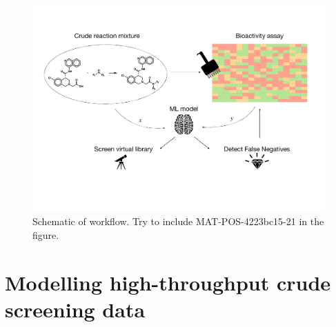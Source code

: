 
\begin{figure}
    \centering
    \includegraphics[width=\textwidth]{Chapters/Crude/Figs/schematic.pdf}
    \caption{Schematic of workflow. Try to include MAT-POS-4223bc15-21 in the figure. }
    \label{fig:schematic}
\end{figure}

\section{Modelling high-throughput crude screening data}

